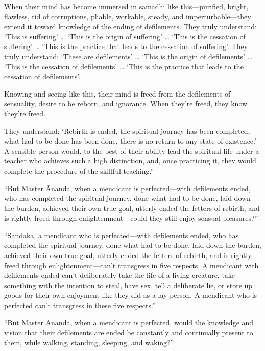\documentclass[12pt,openany]{book}%
\begin{document}
When their mind has become immersed in \textsanskrit{samādhi} like this—purified, bright, flawless, rid of corruptions, pliable, workable, steady, and imperturbable—they extend it toward knowledge of the ending of defilements. They truly understand: ‘This is suffering’ … ‘This is the origin of suffering’ … ‘This is the cessation of suffering’ … ‘This is the practice that leads to the cessation of suffering’. They truly understand: ‘These are defilements’ … ‘This is the origin of defilements’ … ‘This is the cessation of defilements’ … ‘This is the practice that leads to the cessation of defilements’. 

Knowing and seeing like this, their mind is freed from the defilements of sensuality, desire to be reborn, and ignorance. When they’re freed, they know they’re freed. 

They understand: ‘Rebirth is ended, the spiritual journey has been completed, what had to be done has been done, there is no return to any state of existence.’ A sensible person would, to the best of their ability lead the spiritual life under a teacher who achieves such a high distinction, and, once practicing it, they would complete the procedure of the skillful teaching.” 

“But Master Ānanda, when a mendicant is perfected—with defilements ended, who has completed the spiritual journey, done what had to be done, laid down the burden, achieved their own true goal, utterly ended the fetters of rebirth, and is rightly freed through enlightenment—could they still enjoy sensual pleasures?” 

“Sandaka, a mendicant who is perfected—with defilements ended, who has completed the spiritual journey, done what had to be done, laid down the burden, achieved their own true goal, utterly ended the fetters of rebirth, and is rightly freed through enlightenment—can’t transgress in five respects. A mendicant with defilements ended can’t deliberately take the life of a living creature, take something with the intention to steal, have sex, tell a deliberate lie, or store up goods for their own enjoyment like they did as a lay person. A mendicant who is perfected can’t transgress in these five respects.” 

“But Master Ānanda, when a mendicant is perfected, would the knowledge and vision that their defilements are ended be constantly and continually present to them, while walking, standing, sleeping, and waking?” 
\end{document}
